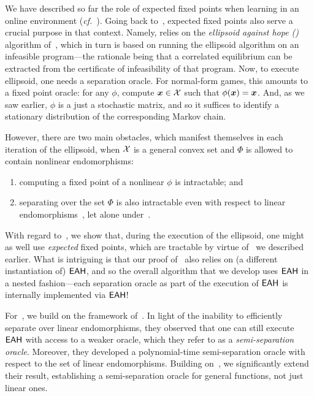 We have described so far the role of expected fixed points when learning in an online environment (\emph{cf.}~). Going back to~, expected fixed points also serve a crucial purpose in that context. Namely,  relies on the \emph{ellipsoid against hope (\eah)} algorithm of~\citet{Papadimitriou08:Computing}, which in turn is based on running the ellipsoid algorithm on an infeasible program---the rationale being that a correlated equilibrium can be extracted from the certificate of infeasibility of that program. Now, to execute ellipsoid, one needs a separation oracle. For normal-form games, this amounts to a fixed point oracle: for any $\phi$, compute ${\bm{x}} \in {\mathcal{X}}$ such that $\phi({\bm{x}}) = {\bm{x}}$. And, as we saw earlier, $\phi$ is a just a stochastic matrix, and so it suffices to identify a stationary distribution of the corresponding Markov chain.

However, there are two main obstacles, which manifest themselves in each iteration of the ellipsoid, when ${\mathcal{X}}$ is a general convex set and $\Phi$ is allowed to contain nonlinear endomorphisms:

\begin{enumerate}
    \item computing a fixed point of a nonlinear $\phi$ is intractable; and\label{item:first}
    \item separating over the set $\Phi$ is also intractable even with respect to linear endomorphisms~\citep{Daskalakis24:Efficient}, let alone under~.\label{item:second}
\end{enumerate}

With regard to~, we show that, during the execution of the ellipsoid, one might as well use \emph{expected} fixed points, which are tractable by virtue of~ we described earlier. What is intriguing is that our proof of~ also relies on (a different instantiation of) $\textsf{EAH}$, and so the overall algorithm that we develop uses $\textsf{EAH}$ in a nested fashion---each separation oracle as part of the execution of $\textsf{EAH}$ is internally implemented via $\textsf{EAH}$!

For~, we build on the framework of~\citet{Daskalakis24:Efficient}. In light of the inability to efficiently separate over linear endomorphisms, they observed that one can still execute $\textsf{EAH}$ with access to a weaker oracle, which they refer to as a \emph{semi-separation oracle}. Moreover, they developed a polynomial-time semi-separation oracle with respect to the set of linear endomorphisms. Building on~, we significantly extend their result, establishing a semi-separation oracle for general functions, not just linear ones.

